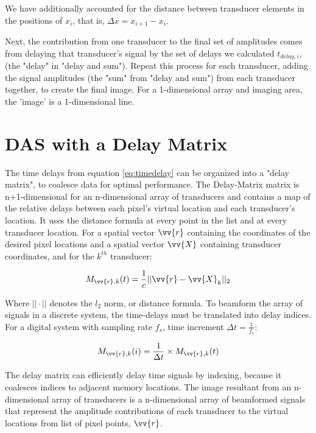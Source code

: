     We have additionally accounted for the distance between transducer elements in the positions of $x_i$, that is, $\Delta{x} = x_{i+1} - x_i$.

    Next, the contribution from one transducer to the final set of amplitudes comes from delaying that transducer's signal by the set of delays we calculated $t_{delay,i}$, (the "delay" in "delay and sum"). Repeat this process for each transducer, adding the signal amplitudes (the "sum" from "delay and sum") from each transducer together, to create the final image. For a 1-dimensional array and imaging area, the 'image' is a 1-dimensional line.

\section{DAS with a Delay Matrix}
\label{chapter2:delay_matrix}

    The time delays from equation \ref{eq:timedelay} can be organized into a "delay matrix", to coalesce data for optimal performance. The Delay-Matrix matrix is n+1-dimensional for an n-dimensional array of transducers and contains a map of the relative delays between each pixel's virtual location and each transducer's location. It uses the distance formula at every point in the list and at every transducer location. For a spatial vector $\vv{r}$ containing the coordinates of the desired pixel locations and a spatial vector $\vv{X}$ containing transducer coordinates, and for the $k^{th}$ transducer: 

    \begin{equation}
        M_{\vv{r},k}(t) = \frac{1}{c} || \vv{r} - \vv{X}_k||_2
    \end{equation}

    Where $||\cdot||$ denotes the $l_2$ norm, or distance formula. To beamform the array of signals in a discrete system, the time-delays must be translated into delay indices. For a digital system with sampling rate $f_s$, time increment $\Delta{t} = \frac{1}{f_s}$:

    \begin{equation}
        M_{\vv{r},k}(i) = \frac{1}{\Delta{t}} \times M_{\vv{r},k}(t)    
    \end{equation}

    The delay matrix can efficiently delay time signals by indexing, because it coalesces indices to adjacent memory locations. The image resultant from an n-dimensional array of transducers is a n-dimensional array of beamformed signals that represent the amplitude contributions of each transducer to the virtual locations from list of pixel points, $\vv{r}$.

